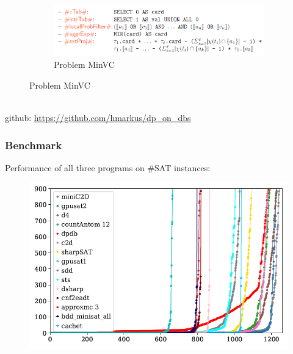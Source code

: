 \documentclass[c,8pt,xcolor...,x11names]{beamer}
\begin{document}
\begin{frame}
\begin{minipage}{0.54\textwidth}
\begin{figure}
\begin{subfigure}[b]{\textwidth}
			\end{subfigure}\hfill\\
			\begin{subfigure}[b]{\textwidth}
				\includegraphics[width=0.8\linewidth]{images/dpdbMinVC.png}
				\caption{Problem MinVC}

			\end{subfigure}
		\end{figure}

	\end{minipage}
	\medskip \\
	github: \url{https://github.com/hmarkus/dp_on_dbs}
\end{frame}
\begin{frame}
	\medskip
	\frametitle{Benchmark}
	{\color{blue}Performance of all three programs on \#SAT instances:} \medskip\\
	\begin{figure}
		\includegraphics[width=0.8\linewidth]{images/dpdbRuntime.png}
	\end{figure}
\end{frame}


\end{document}
